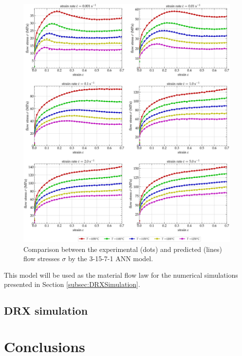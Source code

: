 \documentclass[metals,article,submit,pdftex,moreauthors]{Definitions/mdpi}
\begin{document}
\begin{figure}[H]
\centering
\includegraphics[width=0.9\columnwidth]{Figures/CompExpANN-3-15-7-1}
\caption{Comparison between the experimental (dots) and predicted (lines) flow stresses $\sigma$ by the 3-15-7-1 ANN model.}
\label{fig:ANN-3-15-7-1}
\end{figure}
This model will be used as the material flow law for the numerical simulations presented in Section \ref{subsec:DRXSimulation}.

\subsection{DRX simulation\label{subsec:DRXSimulation}}

\section{Conclusions\label{sec:Conclusions}}
\end{document}
